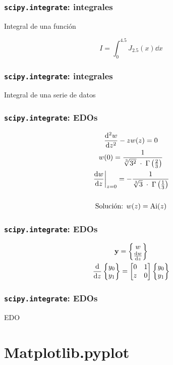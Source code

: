 \documentclass{beamer}
\begin{document}
\begin{frame}\frametitle{\texttt{scipy.integrate}: integrales}
	
	\begin{block}{Integral de una función}

	$$ I = \int_0^{4.5} J_{2.5}(x)\dd{x}$$

		
	\end{block}
\end{frame}

\begin{frame}\frametitle{\texttt{scipy.integrate}: integrales}
	\begin{block}{Integral de una serie de datos}
		
	\end{block}
\end{frame}

\begin{frame}\frametitle{\texttt{scipy.integrate}: EDOs}
	\begin{gather*}
		\dv[2]{w}{z} - z w(z) = 0\\
		w(0) = \frac{1}{\sqrt[3]{3^2}\;\cdot\; \Gamma\left(\frac{2}{3}\right)}\\
		\left.\dv{w}{z}\right|_{z=0} = - \frac{1}{\sqrt[3]{3}\;\cdot\; \Gamma\left(\frac{1}{3}\right)}\\
		\quad \\
		\text{Solución: } w(z) = \mathrm{Ai}(z)
	\end{gather*}
\end{frame}

\begin{frame}\frametitle{\texttt{scipy.integrate}: EDOs}
	\begin{gather*}
		\vb{y} = \begin{Bmatrix}
			w \\
			\dv{w}{z}
		\end{Bmatrix} \\
		\dv{}{z} 
		\begin{Bmatrix}
			y_0 \\ y_1
		\end{Bmatrix}
		= 
		\begin{bmatrix}
			0 & 1 \\
			z & 0 \\
		\end{bmatrix}  
		\begin{Bmatrix}
			y_0 \\ y_1
		\end{Bmatrix}
	\end{gather*}
\end{frame}

\begin{frame}\frametitle{\texttt{scipy.integrate}: EDOs}
	\begin{block}{EDO}
	\end{block}
\end{frame}


\section{Matplotlib.pyplot}
\end{document}
